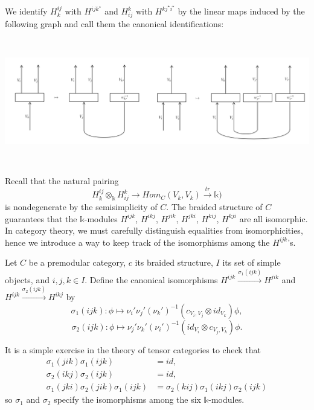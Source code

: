 \noindent We identify $H_{k}^{ij}$ with $H^{ijk^{\star}}$ and
$H_{ij}^{k}$ with $H^{kj^{\star}i^{\star}}$ by the linear maps
induced by the following graph and call them the canonical
identifications:
\begin{center}
  \includegraphics[height=5.5cm]{identification}
\end{center}
\noindent Recall that the natural pairing
$$H^{ij}_{k} \otimes_{\mathbb{k}} H_{ij}^{k} \to Hom_{C}(V_{k},V_{k}) \xrightarrow{tr} \mathbb{k})$$
is nondegenerate by the semisimplicity of $C$. The braided
structure of $C$ guarantees that the $\mathbb{k}$-modules
$H^{ijk}$, $H^{ikj}$, $H^{jik}$, $H^{jki}$, $H^{kij}$, $H^{kji}$
are all isomorphic. In category theory, we must carefully
distinguish equalities from isomorphicities, hence we introduce a
way to keep track of the isomorphisms among the $H^{ijk}$'s.

\begin{definition}\label{def/canonical-isomorphism}
  Let $C$ be a premodular category, $c$ its braided structure,
  $I$ its set of simple objects, and $i,j,k \in I$. Define the
  canonical isomorphisms
  $H^{ijk} \xrightarrow{\sigma_{1}(ijk)} H^{jik}$ and
  $H^{ijk} \xrightarrow{\sigma_{2}(ijk)} H^{ikj}$ by
  $$\sigma_{1}(ijk): \phi \mapsto \nu_{i}'\nu_{j}'(\nu_{k}')^{-1}(c_{V_{i}, V_{j}} \otimes id_{V_{k}})\phi,$$
  $$\sigma_{2}(ijk): \phi \mapsto \nu_{j}'\nu_{k}'(\nu_{i}')^{-1}(id_{V_{i}} \otimes c_{V_{j}, V_{k}})\phi.$$
\end{definition}

\noindent It is a simple exercise in the theory of tensor
categories to check that
\begin{equation} \label{eq1}
  \begin{split}
    \sigma_{1}(jik)\sigma_{1}(ijk) & = id, \\
    \sigma_{2}(ikj)\sigma_{2}(ijk) & = id, \\
    \sigma_{1}(jki)\sigma_{2}(jik)\sigma_{1}(ijk) & = \sigma_{2}(kij)\sigma_{1}(ikj)\sigma_{2}(ijk)
  \end{split}
\end{equation}
so $\sigma_{1}$ and $\sigma_{2}$ specify the isomorphisms among
the six $\mathbb{k}$-modules.

